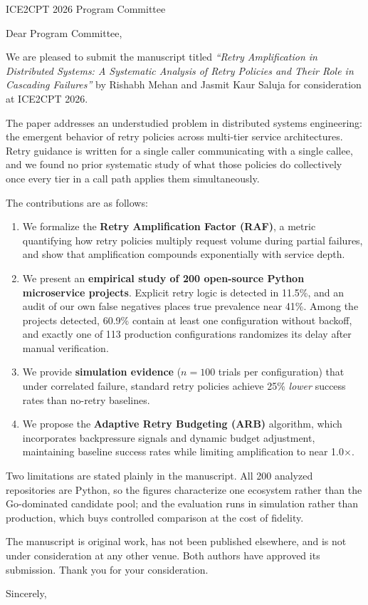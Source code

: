 \documentclass[11pt]{letter}
\begin{document}
\begin{letter}{ICE2CPT 2026 Program Committee}

\opening{Dear Program Committee,}

We are pleased to submit the manuscript titled \textit{``Retry Amplification in Distributed Systems: A Systematic Analysis of Retry Policies and Their Role in Cascading Failures''} by Rishabh Mehan and Jasmit Kaur Saluja for consideration at ICE2CPT 2026.

The paper addresses an understudied problem in distributed systems engineering: the emergent behavior of retry policies across multi-tier service architectures. Retry guidance is written for a single caller communicating with a single callee, and we found no prior systematic study of what those policies do collectively once every tier in a call path applies them simultaneously.

The contributions are as follows:

\begin{enumerate}
    \item We formalize the \textbf{Retry Amplification Factor (RAF)}, a metric quantifying how retry policies multiply request volume during partial failures, and show that amplification compounds exponentially with service depth.

    \item We present an \textbf{empirical study of 200 open-source Python microservice projects}. Explicit retry logic is detected in 11.5\%, and an audit of our own false negatives places true prevalence near 41\%. Among the projects detected, 60.9\% contain at least one configuration without backoff, and exactly one of 113 production configurations randomizes its delay after manual verification.

    \item We provide \textbf{simulation evidence} ($n=100$ trials per configuration) that under correlated failure, standard retry policies achieve 25\% \textit{lower} success rates than no-retry baselines.

    \item We propose the \textbf{Adaptive Retry Budgeting (ARB)} algorithm, which incorporates backpressure signals and dynamic budget adjustment, maintaining baseline success rates while limiting amplification to near 1.0$\times$.
\end{enumerate}

Two limitations are stated plainly in the manuscript. All 200 analyzed repositories are Python, so the figures characterize one ecosystem rather than the Go-dominated candidate pool; and the evaluation runs in simulation rather than production, which buys controlled comparison at the cost of fidelity.

The manuscript is original work, has not been published elsewhere, and is not under consideration at any other venue. Both authors have approved its submission. Thank you for your consideration.

\closing{Sincerely,}

\end{letter}
\end{document}
